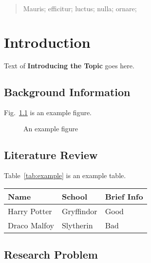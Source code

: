 \documentclass{swfuthesise}
\begin{document}
\maketitle

\begin{abstract}
  \lipsum[1-3]

  \begin{keyword}
    Mauris; efficitur; luctus; nulla; ornare;
  \end{keyword}
\end{abstract}

\tableofcontents %

\chapter{Introduction}

Text of \textbf{Introducing the Topic} goes here\cite{harrypotter}. \lipsum[4]

\section{Background Information}
\lipsum[5] Fig.~\ref{fig:example} is an example figure.

\begin{figure}
  \centering%
  \caption{An example figure\label{fig:example}}
\end{figure}

\section{Literature Review}

\lipsum[6] Table~\ref{tab:example} is an example table.

\begin{center}\singlespacing
  \begin{tabular}{lll}
    \toprule
    Name&School&Brief Info\\\midrule
    Harry Potter&Gryffindor&Good\\
    Draco Malfoy&Slytherin&Bad\\\bottomrule
  \end{tabular}
\end{center}


\section{Research Problem}
\lipsum[7]
\end{document}
